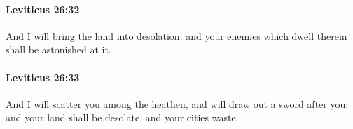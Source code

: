 		\paragraph{Leviticus 26:32} %
			\label{LEVITICUS-26-32}

			And I will bring the land into desolation: and your enemies which dwell therein shall be astonished at it.


		\paragraph{Leviticus 26:33} %
			\label{LEVITICUS-26-33}

			And I will scatter you among the heathen, and will draw out a sword after you: and your land shall be desolate, and your cities waste.


